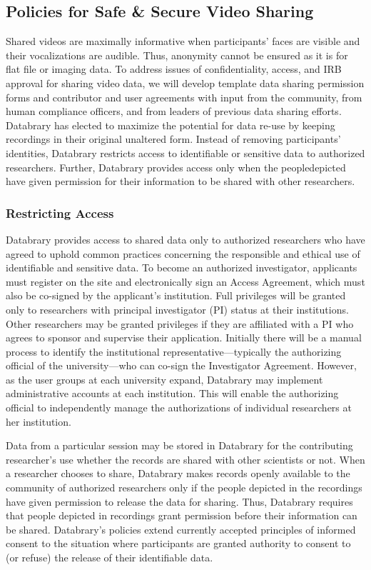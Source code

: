 \documentclass[letterpaper,man,apacite]{apa6}
\begin{document}
\subsection{Policies for Safe \& Secure Video Sharing}

Shared videos are maximally informative when participants’ faces are visible and their vocalizations are audible. Thus, anonymity cannot be ensured as it is for flat file or imaging data. 
To address issues of confidentiality, access, and IRB approval for sharing video data, we will develop template data sharing permission forms and contributor and user agreements with input from the community, from human compliance officers, and from leaders of previous data sharing efforts.
Databrary has elected to maximize the potential for data re-use by keeping recordings in their original
unaltered form. 
Instead of removing participants’ identities, Databrary restricts access to identifiable or sensitive data to authorized researchers. 
Further, Databrary provides access only when the peopledepicted have given permission for their information to be shared with other researchers.

\subsubsection{Restricting Access}
Databrary provides access to shared data only to authorized researchers who have agreed to uphold common practices concerning the responsible and ethical use of identifiable and sensitive data. 
To become an authorized investigator, applicants must register on the site and electronically sign an Access Agreement, which must also be co-signed by the applicant’s institution. 
Full privileges will be granted only to researchers with principal investigator (PI) status
at their institutions. 
Other researchers may be granted privileges if they are affiliated with a PI who agrees to sponsor and supervise their application. 
Initially there will be a manual process to identify the institutional representative—typically the authorizing official of the university—who can co-sign the Investigator Agreement. 
However, as the user groups at each university expand, Databrary may implement
administrative accounts at each institution. 
This will enable the authorizing official to independently manage the authorizations of
individual researchers at her institution.

Data from a particular session may be stored in Databrary for the contributing researcher’s use whether the records are shared with other scientists or not. 
When a researcher chooses to share, Databrary makes records openly available to the community of authorized researchers only if the people depicted in the recordings have given permission to release the data for sharing. 
Thus, Databrary requires that people depicted in recordings grant permission before their information can be
shared.
Databrary’s policies extend currently accepted principles of informed consent to the situation where participants are granted authority to consent to (or refuse) the release of their identifiable data.
\end{document}
